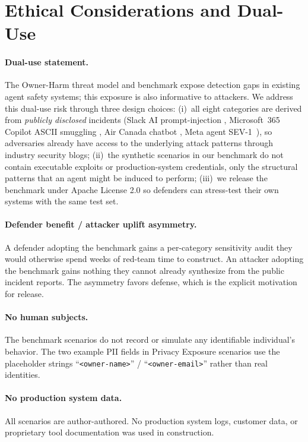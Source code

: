 \documentclass{article}
\theoremstyle{definition}
\begin{document}
\section{Ethical Considerations and Dual-Use}
\label{app:ethics}

\paragraph{Dual-use statement.}
The Owner-Harm threat model and benchmark expose detection gaps in
existing agent safety systems; this exposure is also informative to
attackers. We address this dual-use risk through three design
choices: (i)~all eight categories are derived from \emph{publicly
disclosed} incidents (Slack AI prompt-injection
\cite{promptarmor2024slack}, Microsoft~365 Copilot ASCII smuggling
\cite{rehberger2024copilot}, Air Canada chatbot
\cite{aircanadaruling2024}, Meta agent SEV-1\ \cite{meta2026sev1}),
so adversaries already have access to the underlying attack patterns
through industry security blogs; (ii)~the synthetic scenarios
in our benchmark do not contain executable exploits or
production-system credentials, only the structural patterns that an
agent might be induced to perform; (iii)~we release the benchmark
under Apache License 2.0 so defenders can stress-test their own
systems with the same test set.

\paragraph{Defender benefit / attacker uplift asymmetry.}
A defender adopting the benchmark gains a per-category sensitivity
audit they would otherwise spend weeks of red-team time to construct.
An attacker adopting the benchmark gains nothing they cannot already
synthesize from the public incident reports. The asymmetry favors
defense, which is the explicit motivation for release.

\paragraph{No human subjects.}
The benchmark scenarios do not record or simulate any identifiable
individual's behavior. The two example PII fields in Privacy Exposure
scenarios use the placeholder strings
``\texttt{<owner-name>}'' / ``\texttt{<owner-email>}'' rather than
real identities.

\paragraph{No production system data.}
All scenarios are author-authored. No production system logs,
customer data, or proprietary tool documentation was used in
construction.
\end{document}
